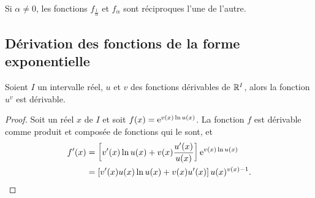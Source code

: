 Si \(\alpha \neq 0\), les fonctions \(f_{\frac{1}{\alpha}}\) et \(f_\alpha\) sont réciproques l'une de l'autre.
%
\subsection{Dérivation des fonctions de la forme exponentielle}
\label{subsec:chap1-derivationdesfonctionsdelaformeexponentielle}
\begin{prop}
  Soient \(I\) un intervalle réel, \(u\) et \(v\) des fonctions dérivables de \(\mathbb{R}^{I}\), alors la fonction \(u^v\) est dérivable.
\end{prop}
\begin{proof}
  Soit un réel \(x\) de \(I\) et soit \(f(x)=\operatorname{e}^{v(x) \ln u(x)}\). La fonction \(f\) est dérivable comme produit et composée de fonctions qui le sont, et
  \begin{align}
    f'(x) &=\left[ v'(x) \ln u(x) + v(x) \frac{u'(x)}{u(x)} \right]\operatorname{e}^{v(x) \ln u(x)} \\
    &= \left[v'(x)u(x)\ln u(x) + v(x) u'(x) \right]u(x)^{v(x)-1}.
  \end{align}
\end{proof}
%
